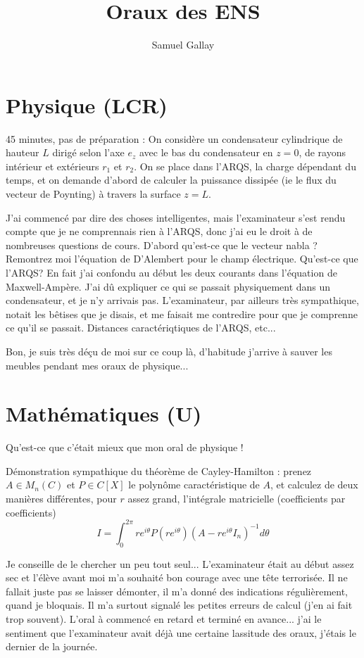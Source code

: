 \documentclass[french,a4paper, 12pt]{article}
\title{\textbf{Oraux des ENS}}
\author{Samuel Gallay}
\begin{document}
\maketitle

\section*{Physique (LCR)}

45 minutes, pas de préparation : On considère un condensateur cylindrique de hauteur $L$ dirigé selon l'axe $e_z$ avec le bas du condensateur en $z = 0$, de rayons intérieur et extérieurs $r_1$ et $r_2$. On se place dans l'ARQS, la charge dépendant du temps, et on demande d'abord de calculer la puissance dissipée (ie le flux du vecteur de Poynting) à travers la surface $z = L$.

J'ai commencé par dire des choses intelligentes, mais l'examinateur s'est rendu compte que je ne comprennais rien à l'ARQS, donc j'ai eu le droit à de nombreuses questions de cours. D'abord qu'est-ce que le vecteur nabla ? Remontrez moi l'équation de D'Alembert pour le champ électrique. Qu'est-ce que l'ARQS? En fait j'ai confondu au début  les deux courants dans l'équation de Maxwell-Ampère. J'ai dû expliquer ce qui se passait physiquement dans un condensateur, et je n'y arrivais pas. L'examinateur, par ailleurs très sympathique, notait les bêtises que je disais, et me faisait me contredire pour que je comprenne ce qu'il se passait. Distances caractériqtiques de l'ARQS, etc...

Bon, je suis très déçu de moi sur ce coup là, d'habitude j'arrive à sauver les meubles pendant mes oraux de physique...

\section*{Mathématiques (U)}
Qu'est-ce que c'était mieux que mon oral de physique !

Démonstration sympathique du théorème de Cayley-Hamilton : prenez $A \in M_n(C)$ et $P\in C[X]$ le polynôme caractéristique de $A$, et calculez de deux manières différentes, pour $r$ assez grand, l'intégrale matricielle (coefficients par coefficients) $$I = \int_0^{2\pi} r e^{i\theta}P(re^{i\theta})(A-re^{i\theta}I_n)^{-1}d\theta$$ 

Je conseille de le chercher un peu tout seul... L'examinateur était au début assez sec et l'élève avant moi m'a souhaité bon courage avec une tête terrorisée. Il ne fallait juste pas se laisser démonter, il m'a donné des indications régulièrement, quand je bloquais. Il m'a surtout signalé les petites erreurs de calcul (j'en ai fait trop souvent). L'oral à commencé en retard et terminé en avance... j'ai le sentiment que l'examinateur avait déjà une certaine lassitude des oraux, j'étais le dernier de la journée.
\end{document}
